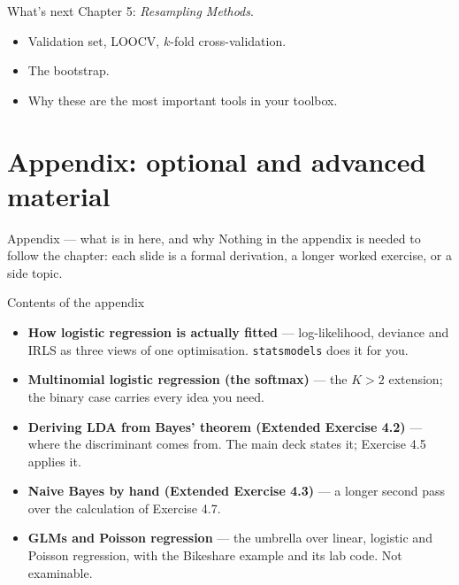 \documentclass[aspectratio=169,11pt]{beamer}
\begin{document}
\begin{frame}{What's next}
  Chapter 5: \emph{Resampling Methods}.
  \begin{itemize}
    \item Validation set, LOOCV, $k$-fold cross-validation.
    \item The bootstrap.
    \item Why these are the most important tools in your toolbox.
  \end{itemize}
\end{frame}


\appendix
\AtBeginSection[]{}
\section{Appendix: optional and advanced material}

\begin{frame}{Appendix --- what is in here, and why}
  \small
  Nothing in the appendix is needed to follow the chapter: each slide is a
  formal derivation, a longer worked exercise, or a side topic.
  \begin{block}{Contents of the appendix}
    \begin{itemize}
      \item \textbf{How logistic regression is actually fitted} --- log-likelihood, deviance and IRLS as three views of one optimisation. \texttt{statsmodels} does it for you.
      \item \textbf{Multinomial logistic regression (the softmax)} --- the $K>2$ extension; the binary case carries every idea you need.
      \item \textbf{Deriving LDA from Bayes' theorem (Extended Exercise 4.2)} --- where the discriminant comes from. The main deck states it; Exercise 4.5 applies it.
      \item \textbf{Naive Bayes by hand (Extended Exercise 4.3)} --- a longer second pass over the calculation of Exercise 4.7.
      \item \textbf{GLMs and Poisson regression} --- the umbrella over linear, logistic and Poisson regression, with the Bikeshare example and its lab code. Not examinable.
    \end{itemize}
  \end{block}
\end{frame}
\end{document}

